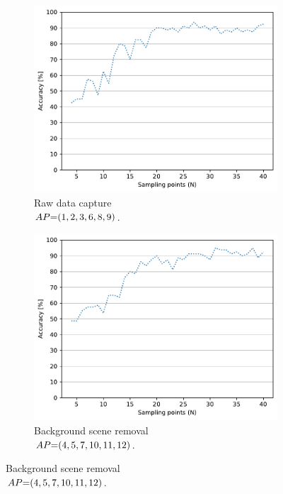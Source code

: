 \begin{figure}[!t]
    \begin{subfigure}{.49\textwidth}
        \centering
        \includegraphics[width=.99\linewidth]{Figures/RadarExperiments/Datasets/SensorsComparison/Walabot/samples-raw.pdf}
        \vspace{-18pt}
        \captionsetup{width=.99\linewidth}
        \caption{Raw data capture \\ $\splitatcommas{AP{=}(1,2,3,6,8,9)}$.}
        \label{fig:radar-experiments:sensors:walabot-samples:raw}
    \end{subfigure}
    \begin{subfigure}{.49\textwidth}
        \centering
        \includegraphics[width=.99\linewidth]{Figures/RadarExperiments/Datasets/SensorsComparison/Walabot/samples-bgsub.pdf}  
        \vspace{-18pt}
        \captionsetup{width=.99\linewidth}
        \caption{Background scene removal \\ $\splitatcommas{AP{=}(4,5,7,10,11,12)}$.}
        \label{fig:radar-experiments:sensors:walabot-samples:bgsub}
    \end{subfigure}
    

\end{figure}
